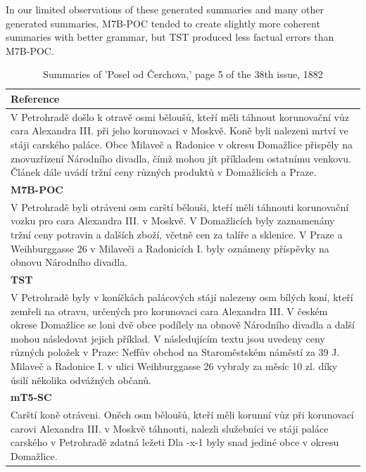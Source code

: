 \documentclass[english, ba, kiv, he, iso690numb, pdf, viewonly]{fasthesis}
\begin{document}
In our limited observations of these generated summaries and many other generated summaries, M7B-POC tended to create slightly more coherent summaries with better grammar, but TST produced less factual errors than M7B-POC.
\begin{table}[h!] 
\centering
\caption{Summaries of 'Posel od Čerchova,' page 5 of the 38th issue, 1882}
\label{eval:tab:example1}
\begin{tabular}{@{}p{}@{}} 
\toprule
\textbf{Reference} \\
\midrule
{\small V Petrohradě došlo k otravě osmi běloušů, kteří měli táhnout korunovační vůz cara Alexandra III. při jeho korunovaci v Moskvě. Koně byli nalezeni mrtví ve stáji carského paláce. Obce Milaveč a Radonice v okresu Domažlice přispěly na znovuzřízení Národního divadla, čímž mohou jít příkladem ostatnímu venkovu. Článek dále uvádí tržní ceny různých produktů v Domažlicích a Praze.} \\
\midrule
\textbf{M7B-POC} \\
{\small V Petrohradě byli otráveni osm carští bělouši, kteří měli táhnouti korunovační vozku pro cara Alexandra III. v Moskvě. V Domažlicích byly zaznamenány tržní ceny potravin a dalších zboží, včetně cen za talíře a sklenice. V Praze a Weihburggasse 26 v Milaveči a Radonicích I. byly oznámeny příspěvky na obnovu Národního divadla.} \\
\midrule
\textbf{TST} \\
{\small V Petrohradě byly v koníčkách palácových stájí nalezeny osm bílých koní, kteří zemřeli na otravu, určených pro korunovaci cara Alexandra III. V českém okrese Domažlice se loni dvě obce podílely na obnově Národního divadla a další mohou následovat jejich příklad. V následujícím textu jsou uvedeny ceny různých položek v Praze: Neffův obchod na Staroměstském náměstí za 39 J. Milaveč a Radonice I. v ulici Weihburggasse 26 vybraly za měsíc 10 zl. díky úsilí několika odvážných občanů.} \\
\midrule
\textbf{mT5-SC} \\
{\small Carští koně otráveni. Oněch osm běloušů, kteří měli korunní vůz při korunovací carovi Alexandra III. v Moskvě táhnouti, nalezli služebníci ve stáji paláce carského v Petrohradě zdatná ležeti Dla -x-1 byly snad jediné obce v okresu Domažlice.} \\
\bottomrule
\end{tabular}
\end{table}
\end{document}
